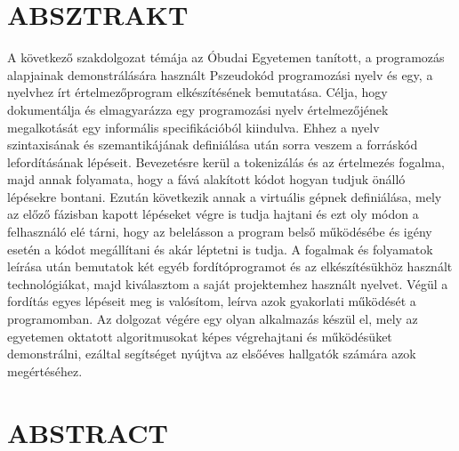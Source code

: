 \documentclass[12pt,a4paper]{article}
\begin{document}




% 

% 






\clearpage
\section{ABSZTRAKT}

A következő szakdolgozat témája az Óbudai Egyetemen tanított, a programozás alapjainak demonstrálására használt Pszeudokód programozási nyelv és egy, a nyelvhez írt értelmezőprogram elkészítésének bemutatása. Célja, hogy dokumentálja és elmagyarázza egy programozási nyelv értelmezőjének megalkotását egy informális specifikációból kiindulva. Ehhez a nyelv szintaxisának és szemantikájának definiálása után sorra veszem a forráskód lefordításának lépéseit. Bevezetésre kerül a tokenizálás és az értelmezés fogalma, majd annak folyamata, hogy a fává alakított kódot hogyan tudjuk önálló lépésekre bontani. Ezután következik annak a virtuális gépnek definiálása, mely az előző fázisban kapott lépéseket végre is tudja hajtani és ezt oly módon a felhasználó elé tárni, hogy az belelásson a program belső működésébe és igény esetén a kódot megállítani és akár léptetni is tudja. A fogalmak és folyamatok leírása után bemutatok két egyéb fordítóprogramot és az elkészítésükhöz használt technológiákat, majd kiválasztom a saját projektemhez használt nyelvet. Végül a fordítás egyes lépéseit meg is valósítom, leírva azok gyakorlati működését a programomban. Az dolgozat végére egy olyan alkalmazás készül el, mely az egyetemen oktatott algoritmusokat képes végrehajtani és működésüket demonstrálni, ezáltal segítséget nyújtva az elsőéves hallgatók számára azok megértéséhez.

\clearpage
\section{ABSTRACT}
\end{document}
